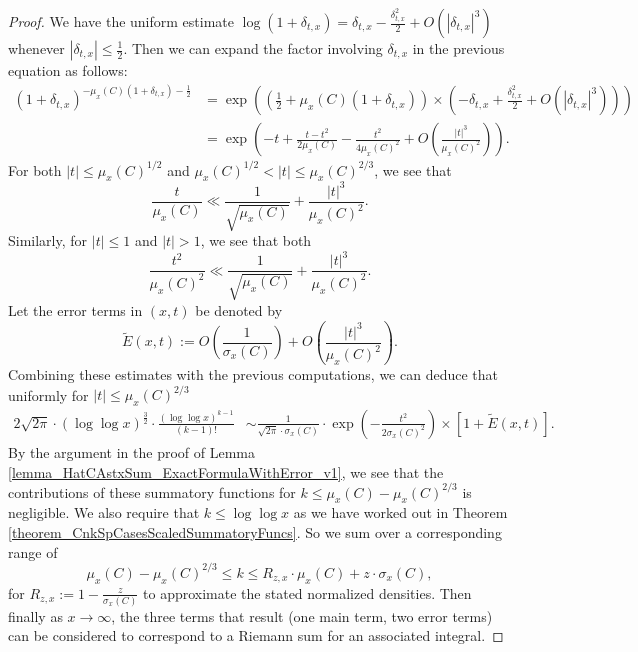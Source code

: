 \documentclass[11pt,reqno,a4letter]{article}
\numberwithin{figure}{section}
\numberwithin{table}{section}
\theoremstyle{plain}
\numberwithin{theorem}{section}
\theoremstyle{definition}
\begin{document}
\begin{proof}
We have the uniform estimate 
$\log(1+\delta_{t,x}) = \delta_{t,x} - \frac{\delta_{t,x}^2}{2} + O(|\delta_{t,x}|^3)$ whenever 
$|\delta_{t,x}| \leq \frac{1}{2}$. Then we can expand the factor involving $\delta_{t,x}$ 
in the previous equation as follows: 
\begin{align*} 
(1+\delta_{t,x})^{-\mu_x(C) (1+\delta_{t,x}) - \frac{1}{2}} & = 
     \exp\left(\left(\frac{1}{2}+\mu_x(C) (1+\delta_{t,x})\right) \times 
     \left(-\delta_{t,x} + \frac{\delta_{t,x}^2}{2} + O(|\delta_{t,x}|^3)\right)\right) \\ 
     & = \exp\left(-t + \frac{t-t^2}{2\mu_x(C)} - \frac{t^2}{4\mu_x(C)^2} + 
     O\left(\frac{|t|^3}{\mu_x(C)^2}\right)\right). 
\end{align*} 
For both $|t| \leq \mu_x(C)^{1/2}$ and 
$\mu_x(C)^{1/2} < |t| \leq \mu_x(C)^{2/3}$, 
we see that 
\[
\frac{t}{\mu_x(C)} \ll \frac{1}{\sqrt{\mu_x(C)}} + \frac{|t|^3}{\mu_x(C)^2}. 
\]
Similarly, for $|t| \leq 1$ and $|t| > 1$, we see that both 
\[
\frac{t^2}{\mu_x(C)^2} \ll \frac{1}{\sqrt{\mu_x(C)}} + 
     \frac{|t|^3}{\mu_x(C)^2}. 
\] 
Let the error terms in $(x, t)$ be denoted by 
\[
\widetilde{E}(x, t) := O\left(\frac{1}{\sigma_x(C)}\right) + 
     O\left(\frac{|t|^3}{\mu_x(C)^2}\right). 
\]
Combining these estimates with the previous computations, we can deduce that 
uniformly for $|t| \leq \mu_x(C)^{2/3}$ 
\begin{align*} 
2\sqrt{2\pi} \cdot (\log\log x)^{\frac{3}{2}} \cdot 
     \frac{(\log\log x)^{k-1}}{(k-1)!} & \sim 
     \frac{1}{\sqrt{2\pi} \cdot \sigma_x(C)} 
     \cdot \exp\left(-\frac{t^2}{2\sigma_x(C)^2}\right) \times 
     \left[1 + \widetilde{E}(x, t)\right]. 
\end{align*} 
By the argument in the proof of 
Lemma \ref{lemma_HatCAstxSum_ExactFormulaWithError_v1}, we see that 
the contributions of these summatory functions for 
$k \leq \mu_x(C) - \mu_x(C)^{2/3}$ is negligible. 
We also require that $k \leq \log\log x$ as we have worked out in 
Theorem \ref{theorem_CnkSpCasesScaledSummatoryFuncs}. So we sum over a 
corresponding range of 
\[
\mu_x(C) -\mu_x(C)^{2/3} \leq k \leq R_{z,x} \cdot \mu_x(C) + z \cdot \sigma_x(C), 
\] 
for $R_{z,x} := 1 - \frac{z}{\sigma_x(C)}$ to approximate the 
stated normalized densities. 
Then finally as $x \rightarrow \infty$, the 
three terms that result (one main term, two error terms) 
can be considered to correspond to a Riemann sum for an associated integral. 
\end{proof} 
\end{document}

